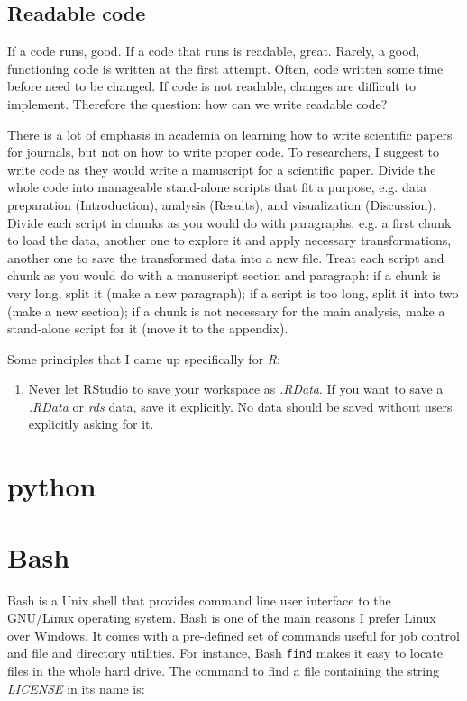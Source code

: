 \documentclass{book}
\begin{document}
\section{Readable code}
If a code runs, good. If a code that runs is readable, great. Rarely, a good, functioning code is written at the first attempt. Often, code written some time before need to be changed. If code is not readable, changes are difficult to implement. Therefore the question: how can we write readable code? 

There is a lot of emphasis in academia on learning how to write scientific papers for journals, but not on how to write proper code. To researchers, I suggest to write code as they would write a manuscript for a scientific paper. Divide the whole code into manageable stand-alone scripts that fit a purpose, e.g. data preparation (Introduction), analysis (Results), and visualization (Discussion). Divide each script in chunks as you would do with paragraphs, e.g. a first chunk to load the data, another one to explore it and apply necessary transformations, another one to save the transformed data into a new file. Treat each script and chunk as you would do with a manuscript section and paragraph: if a chunk is very long, split it (make a new paragraph); if a script is too long, split it into two (make a new section); if a chunk is not necessary for the main analysis, make a stand-alone script for it (move it to the appendix).

Some principles that I came up specifically for \textit{R}:

\begin{enumerate}
    \item Never let RStudio to save your workspace as \textit{.RData}. If you want to save a \textit{.RData} or \textit{rds} data, save it explicitly. No data should be saved without users explicitly asking for it.
\end{enumerate}

\chapter{python}

\chapter{Bash}
\lstset{language=bash}

Bash is a Unix shell that provides command line user interface to the GNU/Linux operating system. Bash is one of the main reasons I prefer Linux over Windows. It comes with a pre-defined set of commands useful for job control and file and directory utilities. For instance, Bash \texttt{find} makes it easy to locate files in the whole hard drive. The command to find a file containing the string \textit{LICENSE} in its name is:
\end{document}
